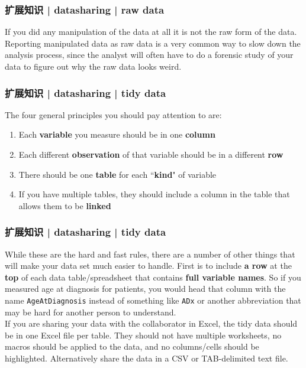 \begin{frame}
  \frametitle{扩展知识 | datasharing | raw data}
  If you did any manipulation of the data at all it is not the raw form of the data. Reporting manipulated data as raw data is a very common way to slow down the analysis process, since the analyst will often have to do a forensic study of your data to figure out why the raw data looks weird.
\end{frame}

\begin{frame}
  \frametitle{扩展知识 | datasharing | tidy data}
  The four general principles you should pay attention to are:
  \begin{enumerate}
    \item Each \textbf{variable} you measure should be in one \textbf{column}
    \item Each different \textbf{observation} of that variable should be in a different \textbf{row}
    \item There should be one \textbf{table} for each ``\textbf{kind}" of variable
    \item If you have multiple tables, they should include a column in the table that allows them to be \textbf{linked}
  \end{enumerate}
\end{frame}

\begin{frame}[fragile]
  \frametitle{扩展知识 | datasharing | tidy data}
  While these are the hard and fast rules, there are a number of other things that will make your data set much easier to handle. First is to include \textbf{a row} at the \textbf{top} of each data table/spreadsheet that contains \textbf{full variable names}. So if you measured age at diagnosis for patients, you would head that column with the name \verb|AgeAtDiagnosis| instead of something like \verb|ADx| or another abbreviation that may be hard for another person to understand. \\
  \vspace{1em}
  If you are sharing your data with the collaborator in Excel, the tidy data should be in one Excel file per table. They should not have multiple worksheets, no macros should be applied to the data, and no columns/cells should be highlighted. Alternatively share the data in a CSV or TAB-delimited text file.
\end{frame}

